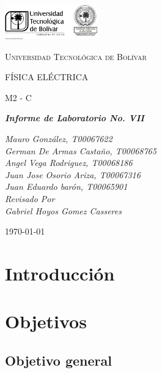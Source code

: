 \documentclass[twocolumn, 12pt]{article}
\begin{document}
\begin{titlepage}
    \centering
    \includegraphics[width=0.3\textwidth]{Images/logo_utb.png}\par\vspace{1cm}
    {\scshape\LARGE Universidad Tecnológica de Bolívar \par}
    \vspace{1cm}

    {\scshape\Large FÍSICA ELÉCTRICA \par}
    \vspace{.2cm}

    {\scshape\Large M2 - C \par}
    \vspace{1cm}
    \slshape {\Large \bfseries{}Informe de Laboratorio No. VII\\}
    \vspace{1cm}

    \slshape {\itshape{} Mauro González, T00067622 \\}
    \slshape {\itshape{} German De Armas Castaño, T00068765 \\}
    \slshape {\itshape{} Angel Vega Rodriguez, T00068186 \\}
    \slshape {\itshape{} Juan Jose Osorio Ariza, T00067316 \\}
    \slshape {\itshape{} Juan Eduardo barón, T00065901 \\}
    \vfill
    Revisado Por \\
    Gabriel Hoyos Gomez Casseres\\
    {\large \today\par}
\end{titlepage}

\section{Introducción}

\section{Objetivos}

\subsection{Objetivo general}
\end{document}
